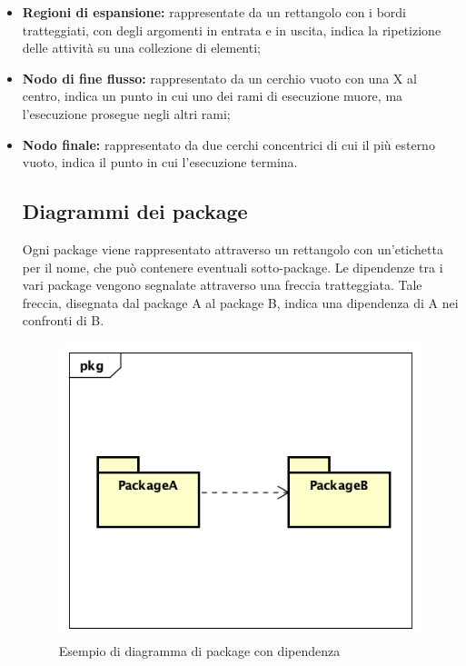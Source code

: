 \begin{itemize}
	\item \textbf{Regioni di espansione:} rappresentate da un rettangolo con i bordi tratteggiati, con degli argomenti in entrata e in uscita,  indica la ripetizione delle attività su una collezione di elementi;
	\item \textbf{Nodo di fine flusso:} rappresentato da un cerchio vuoto con una X al centro, indica un punto in cui uno dei rami di esecuzione muore, ma l'esecuzione prosegue negli altri rami;
	\item \textbf{Nodo finale:} rappresentato da due cerchi concentrici di cui il più esterno vuoto, indica il punto in cui l'esecuzione termina.
	
	\subsection{Diagrammi dei package}
	\label{DiagrammiPackage}
	Ogni package viene rappresentato attraverso un rettangolo con un'etichetta per il nome, che può contenere eventuali sotto-package. Le dipendenze tra i vari package vengono segnalate attraverso una freccia tratteggiata. Tale freccia, disegnata dal package A al package B, indica una dipendenza di A nei confronti di B.
	\begin{figure}[h]
		\centering
		\includegraphics[scale=0.5]{images/DiagrammaPackage.png}
		\caption{Esempio di diagramma di package con dipendenza}\label{}
	\end{figure}
	
	
\end{itemize}

